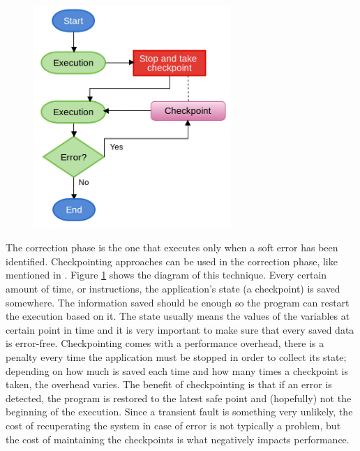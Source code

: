 \begin{figure}	
	\includegraphics[width=7.5cm]{images/Checkpointing.png}
    \label{fig:Checkpointing}
\end{figure}

The correction phase is the one that executes only when a soft error has been identified. Checkpointing approaches can be used in the correction phase, like mentioned in \cite{calhoun2017towards} \cite{kuvaiskii2016haft} \cite{mitropoulou2016comet}. Figure \ref{fig:Checkpointing} shows the diagram of this technique. Every certain amount of time, or instructions, the application's state (a checkpoint) is saved somewhere. The information saved should be enough so the program can restart the execution based on it. The state usually means the values of the variables at certain point in time and it is very important to make sure that every saved data is error-free. Checkpointing comes with a performance overhead, there is a penalty every time the application must be stopped in order to collect its state; depending on how much is saved each time and how many times a checkpoint is taken, the overhead varies. The benefit of checkpointing is that if an error is detected, the program is restored to the latest safe point and (hopefully) not the beginning of the execution. Since a transient fault is something very unlikely, the cost of recuperating the system in case of error is not typically a problem, but the cost of maintaining the checkpoints is what negatively impacts performance.  

